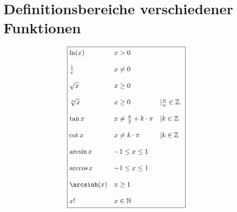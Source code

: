 



\section{Definitionsbereiche verschiedener Funktionen}
\[ \boxed{\begin{array}{@{}lll}
\ln(x)      & x > 0 \\\\
\frac{1}{x} & x \neq 0 \\\\
\sqrt{x}    & x \geq 0 \\\\
\sqrt[n]{x} & x \geq 0 & \vert \frac{n}{n} \in \mathbb{Z} \\\\
\tan{x}     & x \neq \frac{\pi}{2} + k \cdot \pi & \vert k \in \mathbb{Z} \\\\
\cot{x}     & x \neq k \cdot \pi & \vert k \in \mathbb{Z} \\\\
\arcsin{x}  & -1 \leq x \leq 1 \\\\
\arccos{x}  & -1 \leq x \leq 1 \\\\
\arcsinh(x) & x \geq 1 \\\\
x!          & x \in \mathbb{N}
\end{array}} \]
